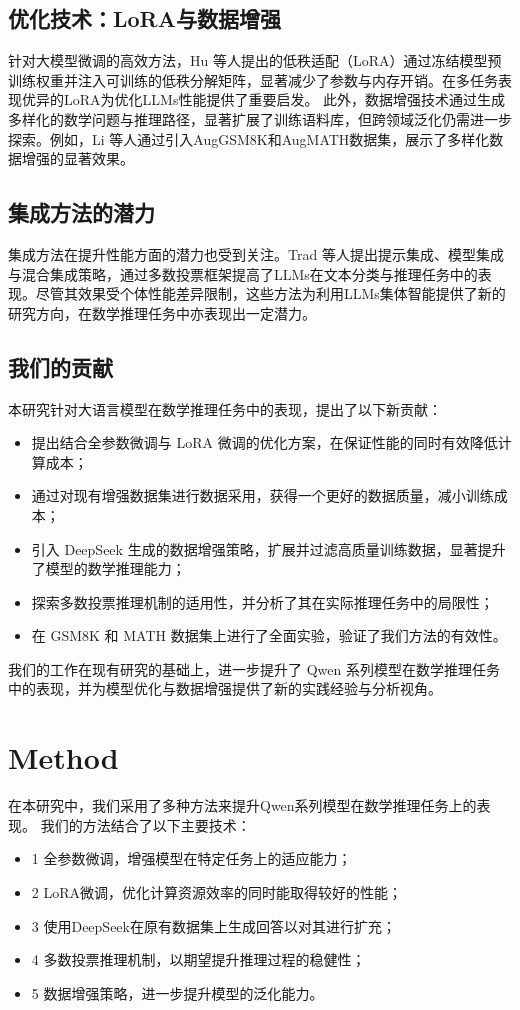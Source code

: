 \documentclass{article}
\begin{document}
\subsection{优化技术：LoRA与数据增强}针对大模型微调的高效方法，Hu 等人提出的低秩适配（LoRA）通过冻结模型预训练权重并注入可训练的低秩分解矩阵，显著减少了参数与内存开销\cite{5}。在多任务表现优异的LoRA为优化LLMs性能提供了重要启发。
此外，数据增强技术通过生成多样化的数学问题与推理路径，显著扩展了训练语料库，但跨领域泛化仍需进一步探索。例如，Li 等人通过引入AugGSM8K和AugMATH数据集，展示了多样化数据增强的显著效果\cite{6}\cite{9}\cite{10}。
\subsection{集成方法的潜力}集成方法在提升性能方面的潜力也受到关注。Trad 等人提出提示集成、模型集成与混合集成策略，通过多数投票框架提高了LLMs在文本分类与推理任务中的表现\cite{8}。尽管其效果受个体性能差异限制，这些方法为利用LLMs集体智能提供了新的研究方向，在数学推理任务中亦表现出一定潜力。
\subsection{我们的贡献}
本研究针对大语言模型在数学推理任务中的表现，提出了以下新贡献：
\begin{itemize}
    \item 提出结合全参数微调与 LoRA 微调的优化方案，在保证性能的同时有效降低计算成本；
    \item 通过对现有增强数据集进行数据采用，获得一个更好的数据质量，减小训练成本；
    \item 引入 DeepSeek 生成的数据增强策略，扩展并过滤高质量训练数据，显著提升了模型的数学推理能力；
    \item 探索多数投票推理机制的适用性，并分析了其在实际推理任务中的局限性；
    \item 在 GSM8K 和 MATH 数据集上进行了全面实验，验证了我们方法的有效性。
\end{itemize}
我们的工作在现有研究的基础上，进一步提升了 Qwen 系列模型在数学推理任务中的表现，并为模型优化与数据增强提供了新的实践经验与分析视角。




\section{Method}


\par 在本研究中，我们采用了多种方法来提升Qwen系列模型在数学推理任务上的表现。
我们的方法结合了以下主要技术：
\begin{itemize}
    \item1 全参数微调，增强模型在特定任务上的适应能力；
    \item2 LoRA微调，优化计算资源效率的同时能取得较好的性能；
    \item3 使用DeepSeek在原有数据集上生成回答以对其进行扩充；
    \item4 多数投票推理机制，以期望提升推理过程的稳健性；
    \item5 数据增强策略，进一步提升模型的泛化能力。
\end{itemize}
 
\end{document}
